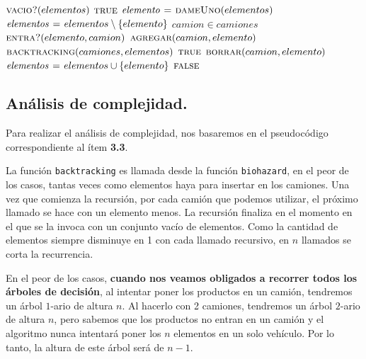 \vspace*{0.5cm}


\begin{codebox}
\li \If $\textnormal{\scshape vacio?}(elementos)$
\li     \Then
            \Return $\textnormal{\scshape true}$
        \End
\li $\id{elemento} \gets \proc{dameUno}(elementos)$
\li $\id{elementos} \gets elementos \setminus \{elemento\}$
\li \For $camion \in camiones$
\li     \Do
            \If $\textnormal{\scshape entra?}(elemento, camion)$
\li             \Then
                    $\textnormal{\scshape agregar}(camion, elemento)$
\li                 \If $\textnormal{\scshape backtracking}(camiones, elementos)$
                        \Then
\li                         \Return $\textnormal{\scshape true}$
\li                 \Else
\li                     $\textnormal{\scshape borrar}(camion, elemento)$
                    \End
            \End
        \End
\li $\id{elementos} \gets elementos \cup \{elemento\}$
\li \Return $\textnormal{\scshape false}$
\end{codebox}



\newpage
\subsection{Análisis de complejidad.}

\vspace*{0.3cm}


Para realizar el análisis de complejidad, nos basaremos en el pseudocódigo
correspondiente al ítem \textbf{3.3}.

La función \verb|backtracking| es llamada desde la función \verb|biohazard|, en
el peor de los casos, tantas veces como elementos haya para insertar en los camiones.
Una vez que comienza la recursión, por cada camión que podemos utilizar,
el próximo llamado se hace con un elemento menos. La recursión finaliza en el momento en
el que se la invoca con un conjunto vacío de elementos. Como la cantidad de
elementos siempre disminuye en 1 con cada llamado recursivo, en $n$ llamados se
corta la recurrencia.

En el peor de los casos, \textbf{cuando nos veamos obligados a recorrer
todos los árboles de decisión}, al intentar poner los productos en un
camión, tendremos un árbol $1$-ario de altura $n$. Al hacerlo con 2
camiones, tendremos un árbol $2$-ario de altura $n$, pero sabemos que los
productos no entran en un camión y el algoritmo nunca intentará poner los
$n$ elementos en un solo vehículo. Por lo tanto, la altura de este árbol será
de $n - 1$.

